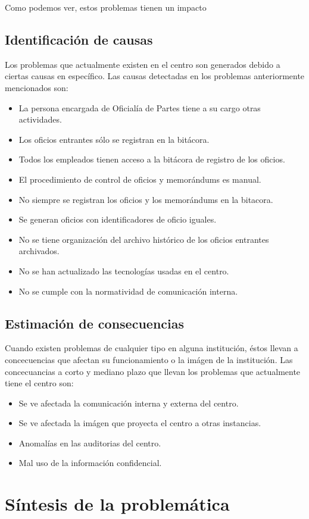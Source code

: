 Como podemos ver, estos problemas tienen un impacto
	\subsection{Identificación de causas}
	Los problemas que actualmente existen en el centro son generados debido a ciertas causas en específico. Las causas detectadas en los problemas anteriormente mencionados son:

\begin{itemize}
	
	\item La persona encargada de Oficialía de Partes tiene a su cargo otras actividades.
	\item Los oficios entrantes sólo se registran en la bitácora.
	\item Todos los empleados tienen acceso a la bitácora de registro de los oficios.
	\item El procedimiento de control de oficios y memorándums es manual.
	\item No siempre se registran los oficios y los memorándums en la bitacora.
	\item Se generan oficios con identificadores de oficio iguales.
	\item No se tiene organización del archivo histórico de los oficios entrantes archivados.
	\item No se han actualizado las tecnologías usadas en el centro.
	\item No se cumple con la normatividad de comunicación interna.
	
\end{itemize}
	\subsection{Estimación de consecuencias}
	Cuando existen problemas de cualquier tipo en alguna institución, éstos llevan a concecuencias que afectan su funcionamiento o la imágen de la institución. Las concecuancias a corto y mediano plazo que llevan los problemas que actualmente tiene el centro son:

\begin{itemize}
	\item Se ve afectada la comunicación interna y externa del centro.
	\item Se ve afectada la imágen que proyecta el centro a otras instancias.
	\item Anomalías en las auditorias del centro.
	\item Mal uso de la información confidencial.
\end{itemize}
\section{Síntesis de la problemática}




